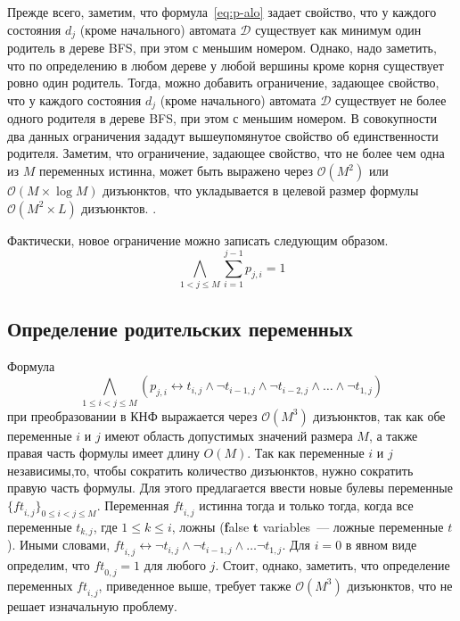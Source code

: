 Прежде всего, заметим, что формула~\eqref{eq:p-alo} задает свойство, что у каждого состояния $d_{j}$ (кроме начального) автомата $\mathcal{D}$ существует как минимум один родитель в дереве BFS, при этом с меньшим номером.
Однако, надо заметить, что по определению в любом дереве у любой вершины кроме корня существует ровно один родитель.
Тогда, можно добавить ограничение, задающее свойство, что у каждого состояния $d_{j}$ (кроме начального) автомата $\mathcal{D}$ существует не более одного родителя в дереве BFS, при этом с меньшим номером.
В совокупности два данных ограничения зададут вышеупомянутое свойство об единственности родителя.
Заметим, что ограничение, задающее свойство, что не более чем одна из $M$ переменных истинна, может быть выражено через $\mathcal{O}\left(M^2\right)$ или $\mathcal{O}\left(M\times \log M\right)$ дизъюнктов, что укладывается в целевой размер формулы $\mathcal{O}\left(M^{2} \times L\right)$ дизъюнктов.
.

Фактически, новое ограничение можно записать следующим образом.
\begin{equation}
\label{eq:p-sum-eq-one}
  \bigwedge_{1 < j \leq M} \sum_{i=1}^{j-1}p_{j,i}=1
\end{equation}


\subsection{Определение родительских переменных}
\label{sec:space:tight:p-def}

Формула 
\begin{equation*}
\bigwedge_{1 \leq i < j \leq M} \left(p_{j,i} \leftrightarrow t_{i,j} \wedge \neg t_{i - 1,j} \wedge \neg t_{i - 2, j} \wedge \ldots \wedge \neg t_{1,j}\right)
\end{equation*}
при преобразовании в КНФ выражается через $\mathcal{O}\left(M^{3}\right)$ дизъюнктов, так как обе переменные $i$ и $j$ имеют область допустимых значений размера $M$, а также правая часть формулы имеет длину $O\left(M\right)$.
Так как переменные $i$ и $j$ независимы,то, чтобы сократить количество дизъюнктов, нужно сократить правую часть формулы.
Для этого предлагается ввести новые булевы переменные $\{\mathit{ft}_{i,j}\}_{0 \leq i < j \leq M}$.
Переменная $\mathit{ft}_{i,j}$ истинна тогда и только тогда, когда все переменные $t_{k,j}$, где $1 \leq k \leq i$, ложны (\textbf{f}alse $\boldsymbol{t}$ variables~{---} ложные переменные $t$).
Иными словами, $\mathit{ft}_{i,j} \leftrightarrow \neg t_{i,j} \wedge \neg t_{i - 1, j} \wedge \ldots \neg t_{1,j}$. 
Для $i = 0$ в явном виде определим, что $\mathit{ft}_{0,j} = 1$ для любого $j$.
Стоит, однако, заметить, что определение переменных $\mathit{ft}_{i,j}$, приведенное выше, требует также $\mathcal{O}\left(M^3\right)$ дизъюнктов, что не решает изначальную проблему.

